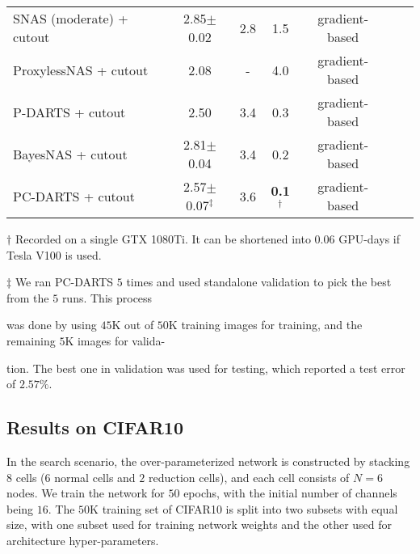 \documentclass{article} \usepackage{iclr2020_conference,times}
\begin{document}
\begin{table}[t]
\begin{threeparttable}[b]
{\begin{tabular}{@{}lcccccc@{}}
SNAS (moderate) + cutout~\citep{xie2018snas}    & 2.85$\pm$0.02 & 2.8  & 1.5  & gradient-based \\
ProxylessNAS + cutout~\citep{cai2018proxylessnas}   & 2.08 & -     &  4.0    & gradient-based \\
P-DARTS + cutout~\citep{chen2019progressive}                                    & 2.50 &  3.4  & 0.3 & gradient-based \\
BayesNAS + cutout~\citep{zhou2019bayesnas}                               & 2.81$\pm$0.04 &  3.4  & 0.2& gradient-based \\
\midrule
PC-DARTS + cutout                                    & 2.57$\pm$0.07$^\ddagger$ & 3.6  & \textbf{0.1}$^\dagger$& gradient-based \\
\bottomrule
\end{tabular}
}
\begin{tablenotes}
\item[$\dagger$] {\footnotesize Recorded on a single GTX 1080Ti. It can be shortened into $0.06$ GPU-days if Tesla V100 is used.}
\item[$\ddagger$] {\footnotesize We ran PC-DARTS $5$ times and used standalone validation to pick the best from the $5$ runs. This process}
\item {\footnotesize was done by using $45\mathrm{K}$ out of $50\mathrm{K}$ training images for training, and the remaining $5\mathrm{K}$ images for valida-}
\item {\footnotesize tion. The best one in validation was used for testing, which reported a test error of $2.57\%$.}
\end{tablenotes}
\end{threeparttable}
\end{table}

\subsection{Results on CIFAR10}
\label{Experiments:CIFAR10}

In the search scenario, the over-parameterized network is constructed by stacking $8$ cells ($6$ normal cells and $2$ reduction cells), and each cell consists of ${N}={6}$ nodes. We train the network for $50$ epochs, with the initial number of channels being $16$. The $50\mathrm{K}$ training set of CIFAR10 is split into two subsets with equal size, with one subset used for training network weights and the other used for architecture hyper-parameters.
\end{document}
